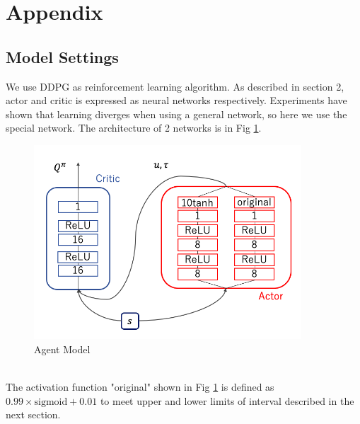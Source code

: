 \documentclass[english, dvipdfmx]{ampmt}             %
\def\numberofspines{1}
\begin{document}
\appendix

\section{Appendix}
\subsection{Model Settings}
We use DDPG as reinforcement learning algorithm. As described in section 2, actor and critic is expressed as neural networks respectively. Experiments have shown that learning diverges when using a general network, so here we use the special network. The architecture of 2 networks is in Fig \ref{NN}.
\begin{figure}[h]
	\centering
 	\includegraphics[width=10cm]{model.png}
 	\caption{Agent Model} \label{NN}
\end{figure}\\
The activation function "original" shown in Fig \ref{NN} is defined as $0.99 \times \textrm{sigmoid} + 0.01$ to meet upper and lower limits of interval described in the next section.\par

\fi
\ifoutputcover
\cleardoublepage
\makecover                      %
\makespine[\numberofspines]     %
\fi
\ifoutputabstractforsubmission
\makeabstractforsubmission      %
\fi
\end{document}
